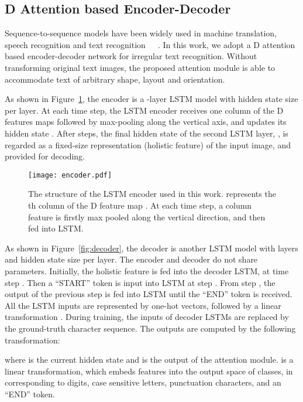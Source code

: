 \documentclass[letterpaper]{article} \usepackage{aaai19}  \usepackage{times}  \usepackage{helvet}  \usepackage{courier}  \usepackage{url}  \usepackage{graphicx}  \usepackage{amsmath}
\begin{document}
\subsection{D Attention based Encoder-Decoder}

Sequence-to-sequence models have been widely used in machine translation, speech recognition and text recognition~\cite{DBLP:conf/nips/Sutskever14}~\cite{Attention15}~\cite{Cheng2017}.
In this work, we adopt a D attention based encoder-decoder network for irregular text recognition.
Without transforming original text images, the proposed attention module is able to accommodate text of arbitrary shape, layout and orientation.


As shown in Figure~\ref{fig:encoder},
the encoder is a -layer LSTM model with  hidden state size per layer.
At each time step, the LSTM encoder receives one column of the D features maps followed by max-pooling along the vertical axis,
and updates its hidden state .
After  steps, the final hidden state of the second LSTM layer, , is regarded as a fixed-size representation (holistic feature) of the input image,
and provided for decoding.

\begin{figure}[t]
	\begin{center}
		\texttt{[image: encoder.pdf]}
	\end{center}
	\caption{The structure of the LSTM encoder used in this work.  represents the th column of the D feature map .
		At each time step, a column feature is firstly max pooled along the vertical direction, and then fed into LSTM.
	}
	\label{fig:encoder}

\end{figure}

As shown in Figure~\ref{fig:decoder},
the decoder is another LSTM model with  layers and   hidden state size per layer.
The encoder and decoder do not share parameters.
Initially, the holistic feature  is fed into the decoder LSTM, at time step .
Then a ``START'' token is input into LSTM at step .
From step ,
the output of the previous step is fed into LSTM until the ``END'' token is received.
All the LSTM inputs are represented by one-hot vectors,
followed by a linear transformation .
During training, the inputs of decoder LSTMs are replaced by the ground-truth character sequence.
The outputs are computed by the following transformation:

where  is the current hidden state and  is the output of the attention module.
 is a linear transformation, which embeds features into the output space of  classes, in corresponding to  digits,  case sensitive letters,  punctuation characters, and an ``END'' token.
\end{document}
